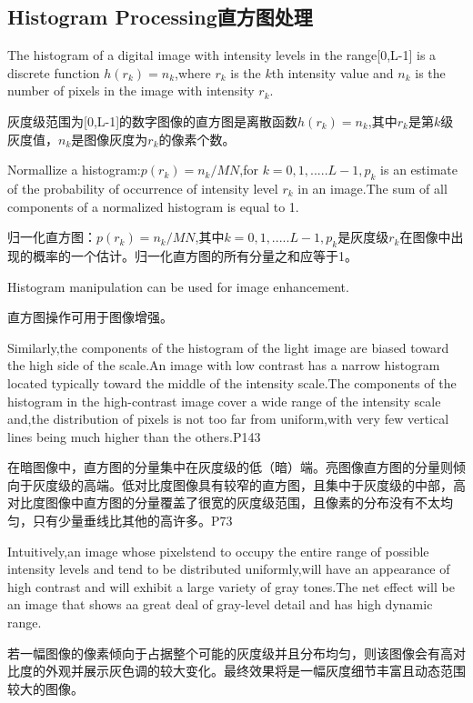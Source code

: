 \documentclass[a4paper,12pt]{article}
\numberwithin{equation}{section}%
\begin{document}
\subsection{Histogram Processing直方图处理}

The histogram of a digital image with intensity levels in the range[0,L-1] is a discrete function $h(r_{k})=n_{k}$,where $r_{k}$ is the $k$th intensity value and $n_{k}$ is the number of pixels in the image with intensity $r_{k}$.

灰度级范围为[0,L-1]的数字图像的直方图是离散函数$h(r_{k})=n_{k}$,其中$r_{k}$是第$k$级灰度值，$n_{k}$是图像灰度为$r_{k}$的像素个数。

Normallize a histogram:$p(r_{k})=n_{k}/MN$,for $k=0,1,.....L-1,p_{k}$ is an estimate of the probability of occurrence of intensity level $r_{k}$ in an image.The sum of all components of a normalized histogram is equal to 1.

归一化直方图：$p(r_{k})=n_{k}/MN$,其中$k=0,1,.....L-1,p_{k}$是灰度级$r_{k}$在图像中出现的概率的一个估计。归一化直方图的所有分量之和应等于1。

Histogram manipulation can be used for image enhancement.

直方图操作可用于图像增强。

Similarly,the components of the histogram of the light image are biased toward the high side of the scale.An image with low contrast has a narrow histogram located typically toward the middle of the intensity scale.The components of the histogram in the high-contrast image cover a wide range of the intensity scale and,the distribution of pixels is not too far from uniform,with very few vertical lines being much higher than the others.P143

在暗图像中，直方图的分量集中在灰度级的低（暗）端。亮图像直方图的分量则倾向于灰度级的高端。低对比度图像具有较窄的直方图，且集中于灰度级的中部，高对比度图像中直方图的分量覆盖了很宽的灰度级范围，且像素的分布没有不太均匀，只有少量垂线比其他的高许多。P73

Intuitively,an image whose pixelstend to occupy the entire range of possible intensity levels and tend to be distributed uniformly,will have an appearance of high contrast and will exhibit a large variety of gray tones.The net effect will be an image that shows aa great deal of gray-level detail and has high dynamic range. 

若一幅图像的像素倾向于占据整个可能的灰度级并且分布均匀，则该图像会有高对比度的外观并展示灰色调的较大变化。最终效果将是一幅灰度细节丰富且动态范围较大的图像。
\end{document}
